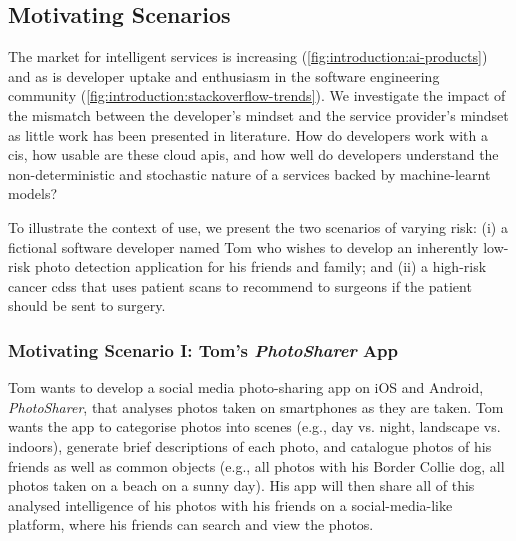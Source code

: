 \subsection{Motivating Scenarios}
\label{ssec:introduction:motivation:scenario}

The market for intelligent services is increasing (\cref{fig:introduction:ai-products}) and as is developer uptake and enthusiasm in the software engineering community (\cref{fig:introduction:stackoverflow-trends}). We investigate the impact of the mismatch between the developer's mindset and the service provider's mindset as little work has been presented in literature. How do developers work with a \gls{cis}, how usable are these cloud \glspl{api}, and how well do developers understand the non-deterministic and stochastic nature of a services backed by machine-learnt models? 

To illustrate the context of use, we present the two scenarios of varying risk: (i) a fictional software developer named Tom who wishes to develop an inherently low-risk photo detection application for his friends and family; and (ii) a high-risk cancer \gls{cdss} that uses patient scans to recommend to surgeons if the patient should be sent to surgery.
  
\subsubsection{Motivating Scenario I: Tom's \textit{PhotoSharer} App}
\label{ssec:introduction:motivation:scenario:pam}

Tom wants to develop a social media photo-sharing app on iOS and Android, \textit{PhotoSharer}, that analyses photos taken on smartphones as they are taken. Tom wants the app to categorise photos into scenes (e.g., day vs. night, landscape vs. indoors), generate brief descriptions of each photo, and catalogue photos of his friends as well as common objects (e.g., all photos with his Border Collie dog, all photos taken on a beach on a sunny day). His app will then share all of this analysed intelligence of his photos with his friends on a social-media-like platform, where his friends can search and view the photos.

